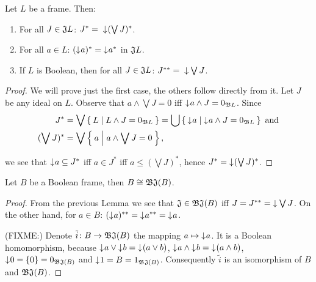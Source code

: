 \begin{lemma}\label{p:idealsFrame} Let $L$ be a frame. Then:
    \begin{enumerate}
        \item For all $J \in \mathfrak{J} L$: $J^* =\;\mathord{\downarrow}\mkern1mu (\bigvee J)^*$.
        \item For all $a \in L$: $(\mathord{\downarrow}\mkern1mu a)^* = \mathord{\downarrow}\mkern1mu a^*$ in $\mathfrak{J} L$.
        \item If $L$ is Boolean, then for all $J \in \mathfrak{J} L$: $J^{**} =\;\mathord{\downarrow}\mkern1mu \bigvee J$.
    \end{enumerate}
\end{lemma}
\begin{proof}
    We will prove just the first case, the others follow directly from it. Let $J$ be any ideal on $L$. Observe that $a \wedge \bigvee J = 0 $ iff $\mathord{\downarrow}\mkern1mu a \wedge J = 0_{\mathfrak{B} L}$. Since
        \begin{align*}
            J^* & = \bigvee \Set{ L | L \wedge J = 0_{\ensuremath{\mathfrak{B}}L} } = \bigcup \Set{ \mathord{\downarrow}\mkern1mua | \mathord{\downarrow}\mkern1mua \wedge J = 0_{\ensuremath{\mathfrak{B}}L} } \text{ and}\\
            (\bigvee J)^* & = \bigvee \Set{ a | a \wedge \bigvee J = 0 },
        \end{align*}

    \noindent we see that $\mathord{\downarrow}\mkern1mu a \subseteq J^*$ iff $a \in J^*$ iff $a \leq (\bigvee J)^*$, hence $J^* = \mathord{\downarrow}\mkern1mu (\bigvee J)^*$.
\end{proof}

\begin{proposition}
    Let $B$ be a Boolean frame, then $B \cong \mathfrak{B}\mathfrak{J}(B)$.
\end{proposition}
\begin{proof}
    From the previous Lemma we see that $\mathfrak{J} \in \mathfrak{B}\mathfrak{J}(B)$ iff $J = J^{**} = \mathord{\downarrow}\mkern1mu \bigvee J$. On the other hand, for $a \in B$: $(\mathord{\downarrow}\mkern1mu a)^{**} = \mathord{\downarrow}\mkern1mu a^{**} = \mathord{\downarrow}\mkern1mu a$.

    (FIXME:) Denote $\tilde i\colon B \to \mathfrak{B}\mathfrak{J}(B)$ the mapping $a \mapsto \mathord{\downarrow}\mkern1mu a$. It is a Boolean homomorphism, because $\mathord{\downarrow}\mkern1mu a \vee \mathord{\downarrow}\mkern1mu b = \mathord{\downarrow}\mkern1mu (a \vee b)$, $\mathord{\downarrow}\mkern1mu a \wedge \mathord{\downarrow}\mkern1mu b = \mathord{\downarrow}\mkern1mu (a \wedge b)$, $\mathord{\downarrow}\mkern1mu 0 = \{0\} = 0_{\mathfrak{B}\mathfrak{J}(B)}$ and $\mathord{\downarrow}\mkern1mu 1 = B = 1_{\mathfrak{B}\mathfrak{J}(B)}$. Consequently $\tilde i$ is an isomorphism of $B$ and $\mathfrak{B}\mathfrak{J}(B)$.
\end{proof}

